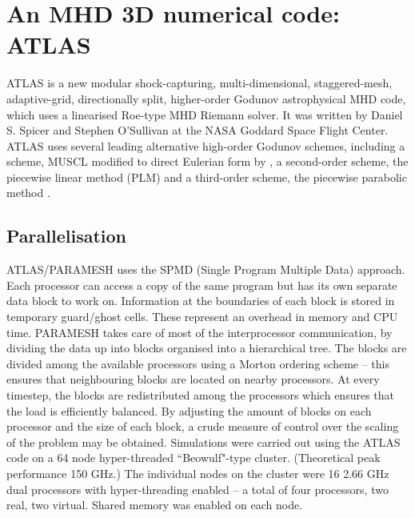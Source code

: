 \section{An MHD 3D numerical code: ATLAS}
ATLAS is a new modular shock-capturing, multi-dimensional, staggered-mesh, adaptive-grid, directionally split, higher-order Godunov astrophysical MHD code, which uses a linearised Roe-type MHD Riemann solver.
It was written by Daniel S. Spicer and Stephen O'Sullivan at the NASA Goddard Space Flight Center.
ATLAS uses several leading alternative high-order Godunov schemes, including a
scheme, MUSCL \citep{1979JCP_vanLeer} modified to direct Eulerian form by
\citet{1984jcp_colella_woodward}, a second-order scheme, the piecewise linear
method (PLM) and a third-order scheme, the piecewise parabolic method
\citep[PPM;][]{1984jcp_colella_woodward}.

\subsection{Parallelisation} 
ATLAS/PARAMESH uses the SPMD (Single Program Multiple Data) approach.
Each processor can access a copy of the same program but has its own separate data block to work on. 
Information at the boundaries of each block is stored in temporary guard/ghost cells. These represent an overhead in memory and CPU time.
PARAMESH takes care of most of the interprocessor communication, by dividing the data up into blocks organised into a hierarchical tree. 
The blocks are divided among the available processors using a Morton ordering scheme -- this ensures that neighbouring blocks are located on nearby processors. 
At every timestep, the blocks are redistributed among the processors which ensures that the load is efficiently balanced.
By adjusting the amount of blocks on each processor and the size of each block, a crude measure of control over the scaling of the problem may be obtained.
Simulations were carried out using the ATLAS code on a 64 node hyper-threaded ``Beowulf"-type cluster. (Theoretical peak performance 150 GHz.) The individual nodes on the cluster were 16 2.66 GHz dual processors with hyper-threading enabled -- a total of four processors, two real, two virtual. Shared memory was enabled on each node. 

